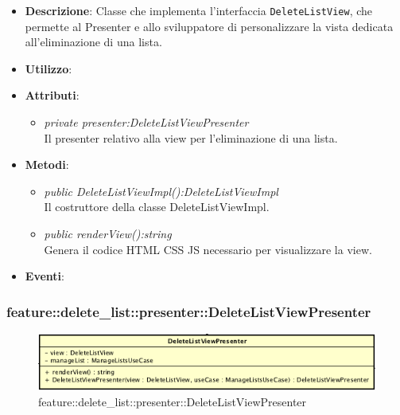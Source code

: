 \begin{itemize}
\item \textbf{Descrizione}: Classe che implementa l'interfaccia \texttt{DeleteListView}, che permette al Presenter e allo sviluppatore di personalizzare la vista dedicata all'eliminazione di una lista.
\item \textbf{Utilizzo}:
\item \textbf{Attributi}: 
	\begin{itemize}
	\item \textit{private presenter:DeleteListViewPresenter}\\
		Il presenter relativo alla view per l'eliminazione di una lista.
	\end{itemize}
\item \textbf{Metodi}:
	\begin{itemize}
	\item \textit{public DeleteListViewImpl():DeleteListViewImpl}\\
	Il costruttore della classe DeleteListViewImpl.
	\item \textit{public renderView():string}\\
			Genera il codice HTML CSS JS necessario per visualizzare la view.
	\end{itemize}
\item \textbf{Eventi}:
\end{itemize}

\subsubsection{feature::delete\_list::presenter::DeleteListViewPresenter}

\label{feature::delete_list::presenter::DeleteListViewPresenter}
\begin{figure}[H]
	\centering
	\includegraphics[scale=0.5]{Sezioni/SottosezioniST/img/app/DeleteListViewPresenter.png}
	\caption{feature::delete\_list::presenter::DeleteListViewPresenter}
\end{figure}

